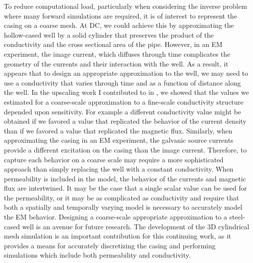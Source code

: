 To reduce computational load, particularly when considering the inverse problem where many forward simulations are required, it is of interest to represent the casing on a coarse mesh. At DC, we could achieve this by approximating the hollow-cased well by a solid cylinder that preserves the product of the conductivity and the cross sectional area of the pipe. However, in an EM experiment, the image current, which diffuses through time complicates the geometry of the currents and their interaction with the well. As a result, it appears that to design an appropriate approximation to the well, we may need to use a conductivity that varies through time and as a function of distance along the well. In the upscaling work I contributed to in \cite{Caudillo-Mata2017}, we showed that the values we estimated for a coarse-scale approximation to a fine-scale conductivity structure depended upon sensitivity. For example a different conductivity value might be obtained if we favored a value that replicated the behavior of the current density than if we favored a value that replicated the magnetic flux. Similarly, when approximating the casing in an EM experiment, the galvanic source currents provide a different excitation on the casing than the image current. Therefore, to capture each behavior on a coarse scale may require a more sophisticated approach than simply replacing the well with a constant conductivity. When permeability is included in the model, the behavior of the currents and magnetic flux are intertwined. It may be the case that a single scalar value can be used for the permeability, or it may be as complicated as conductivity and require that both a spatially and temporally varying model is necessary to accurately model the EM behavior. Designing a coarse-scale appropriate approximation to a steel-cased well is an avenue for future research. The development of the 3D cylindrical mesh simulation is an important contribution for this continuing work, as it provides a means for accurately discretizing the casing and performing simulations which include both permeability and conductivity.

